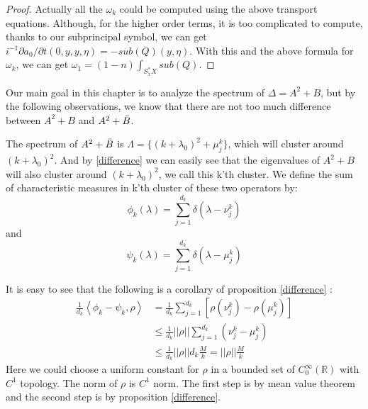 \documentclass[10pt]{amsart}
\newcommand{\R}{{\mathbb R}}
\newcommand{\1}{\mathbb{1}}
\begin{document}
\begin{proof}
Actually all the $\omega_k$ could be computed using the above transport equations. Although, for the higher order terms, it is too complicated to compute, thanks to our subprincipal symbol, we can get $i^{-1} \partial a_0/\partial t (0,y,y,\eta) = -sub(Q)(y,\eta)$. With this and the above formula for $\omega_k$, we can get $\omega_1 =(1-n)\int_{S^*_x X}sub(Q)$.
\end{proof}

Our main goal in this chapter is to analyze the spectrum of $\Delta = A^2 + B$, but by the following observations, we know that there are not too much difference between $A^2 +B$ and $A^2 + \Bar{B}$.

The spectrum of $A^2 + \Bar{B}$ is $\Lambda = \{(k+\lambda_0)^2 + \mu_j^k\}$, which will cluster around $(k+\lambda_0)^2$. And by \eqref{difference} we can easily see that the eigenvalues of $A^2 + B$ will also cluster around $(k+\lambda_0)^2$, we call this k'th cluster. We define the sum of characteristic measures in k'th cluster of these two operators by:
\[
\phi_k (\lambda) = \sum_{j=1}^{d_k} \delta( \lambda - \nu_j^k)
\]
and
\[
\psi_k (\lambda) = \sum_{j=1}^{d_k} \delta( \lambda - \mu_j^k)
\]

It is easy to see that the following is a corollary of proposition \ref{difference} :
\begin{align*}
    \frac{1}{d_k} \left\langle \phi_k - \psi_k , \rho \right\rangle &= \frac{1}{d_k} \sum_{j=1}^{d_k}[\rho(\nu_j^k) - \rho(\mu_j^k)] \\
    &\leq \frac{1}{d_k} ||\rho|| \sum_{j=1}^{d_k}(\nu_j^k- \mu_j^k)\\
    &\leq \frac{1}{d_k} ||\rho|| d_k \frac{M}{k} = ||\rho|| \frac{M}{k}
\end{align*}
Here we could choose a uniform constant for $\rho$ in a bounded set of $C_0^{\infty}(\R)$ with $C^1$ topology. The norm of $\rho$ is $C^1$ norm. The first step is by mean value theorem and the second step is by proposition \ref{difference}.
\end{document}
